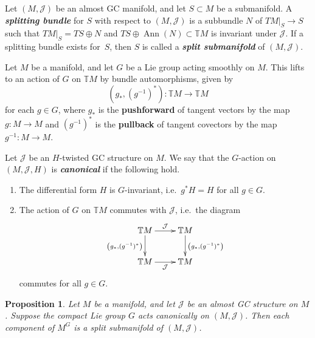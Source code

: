 \documentclass{article}
\newtheorem{Proposition}[Theorem]{Proposition}
\numberwithin{equation}{section}
\newcommand{\deff}[1]{\textbf{\emph{#1}}}
\newcommand{\func}[3]{#1 \colon #2 \to #3}
\newcommand{\pont}[1]{\mathbb{T} {#1}}
\newcommand{\tang}{T}
\begin{document}
\begin{Definition}
Let $(M, \mathcal{J})$ be an almost GC manifold, and let $S \subset M$ be a submanifold.  A \deff{splitting bundle} for $S$ with respect to $(M, \mathcal{J})$ is a subbundle $N$ of $\tang M|_S \to S$ such that $\tang M|_S = \tang S \oplus N$ and $\tang S \oplus \operatorname{Ann} (N) \subset \pont{M}$ is invariant under $\mathcal{J}$. If a splitting bundle exists for~$S$, then $S$ is called a \deff{split submanifold} of $(M,\mathcal{J})$.
\end{Definition}

\begin{Definition}
Let $M$ be a manifold, and let $G$ be a Lie group acting smoothly on $M$.  This lifts to an action of $G$ on $\pont{M}$ by bundle automorphisms, given by
\[
  \func{\left( g_*, (g^{-1})^* \right)}{\pont{M}}{\pont{M}}
\]
for each $g \in G$, where $g_{\ast}$ is the {\bf pushforward} of tangent vectors by the map $\func{g}{M}{M}$ and $(g^{-1})^{\ast}$ is the {\bf pullback} of tangent covectors by the map $\func{g^{-1}}{M}{M}$.

Let $\mathcal{J}$ be an $H$-twisted GC structure on $M$.  We say that the $G$-action on $(M, \mathcal{J}, H)$ is \deff{canonical} if the following hold.
\begin{enumerate}\itemsep=0pt
  \item The dif\/ferential form $H$ is $G$-invariant, i.e.\ $g^* H = H$ for all $g \in G$.
  \item The action of $G$ on $\pont{M}$ commutes with $\mathcal{J}$, i.e.\ the diagram
\[
  \xymatrix{
  \pont{M} \ar[d]_{ \left( g_*, (g^{-1})^* \right) } \ar[r]^{\mathcal{J}}
  &
  \pont{M} \ar[d]^{ \left( g_*, (g^{-1})^* \right) } \\
  \pont{M} \ar[r]_{\mathcal{J}}
  &
  \pont{M}
  }
\]
commutes for all $g \in G$.
\end{enumerate}
\end{Definition}

\begin{Proposition}  \label{prop9}
Let $M$ be a manifold, and let $\mathcal{J}$ be an almost GC structure on $M$. Suppose the compact Lie group $G$ acts canonically on $(M,\mathcal{J})$.  Then each component of $M^{G}$ is a split submanifold of $(M,\mathcal{J})$.
\end{Proposition}
\end{document}
